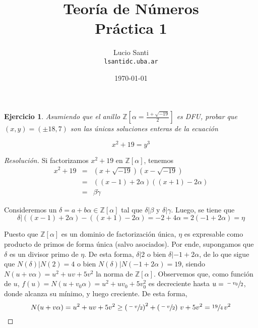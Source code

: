 \documentclass[a4paper,11pt]{article}
\title{Teoría de Números\\
      \small{Práctica 1}}
\author{Lucio Santi\\
        \texttt{lsanti\at dc.uba.ar}}
\date{\today}
\newcommand{\Zm}[1]{\ensuremath{\mathbb{Z}[#1]}}
\newcommand{\Div}[2]{\ensuremath{#1 | #2}}
\newtheorem*{ej}{Ejercicio}
\begin{document}
\maketitle

\begin{ej} 
    Asumiendo que el anillo \Zm{\alpha = \frac{1 + \sqrt{-19}}{2}} es DFU, probar que $(x, y) = (\pm 18, 7)$
son las únicas soluciones enteras de la ecuación

    $$x^2 + 19 = y^3$$
\end{ej}

\begin{proof}[Resoluci\'on]
Si factorizamos $x^2 + 19$ en \Zm{\alpha}, tenemos
\begin{eqnarray*}
    x^2 + 19 &=& (x + \sqrt{-19}) (x - \sqrt{-19}) \\
             &=& \left((x-1) + 2\alpha \right) \left((x+1) - 2\alpha\right) \\
             &=& \beta \dot \gamma
\end{eqnarray*}

Consideremos un
$\delta = a + b \alpha \in \Zm{\alpha}$
tal que $\Div{\delta}{\beta}$ y $\Div{\delta}{\gamma}$. Luego, se tiene que
$$\Div{\delta}{\left((x-1) + 2\alpha \right) - \left((x+1) - 2\alpha\right)} = -2 + 4\alpha = 2 (-1 + 2\alpha) = \eta$$

Puesto que \Zm{\alpha} es un dominio de factorización única, $\eta$ es expresable como producto de primos
de forma única (salvo asociados). Por ende, supongamos que $\delta$ es un divisor primo de $\eta$. De esta forma,
$\Div{\delta}{2}$ o bien $\Div{\delta}{-1 + 2\alpha}$, de lo que sigue que 
$\Div{N(\delta)}{N(2) = 4}$ o bien \Div{N(\delta)}{N(-1 + 2\alpha) = 19}, siendo $N(u + v \alpha) = u^2 + uv + 5v^2$
la norma de \Zm{\alpha}. Observemos que, como función de $u$, $f(u) = N(u + v_0\alpha) = u^2 + uv_0 + 5v_0^2$ es
decreciente hasta $u = \sfrac{-v_0}{2}$, donde alcanza su mínimo, y luego creciente. De esta forma,
$$N(u + v\alpha) = u^2 + uv + 5v^2 \geq \left(\sfrac{-v}{2}\right)^2 + \left(\sfrac{-v}{2}\right) \, v + 5v^2 = \sfrac{19}{4} \, v^2$$


\end{proof}
\end{document}
